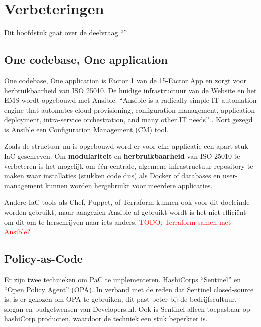 \chapter{Verbeteringen}

\label{Chapter5}

Dit hoofdstuk gaat over de deelvraag \enquote{\deelverbetering}

\section{One codebase, One application}
One codebase, One application is Factor 1 van de 15-Factor App en zorgt voor herbruikbaarheid van ISO 25010. De huidige infrastructuur van de Website en het EMS wordt opgebouwd met Ansible. \enquote{Ansible is a radically simple IT automation engine that automates cloud provisioning, configuration management, application deployment, intra-service orchestration, and many other IT needs} \parencite{Ansible}. Kort gezegd is Ansible een Configuration Management (CM) tool.

Zoals de structuur nu is opgebouwd word er voor elke applicatie een apart stuk IaC geschreven. Om \textbf{modulariteit} en \textbf{herbruikbaarheid} van ISO 25010 \parencite{ISO25010} te verbeteren is het mogelijk om één centrale, algemene infrastructuur repository te maken waar installaties (stukken code dus) als Docker of databases en user-management kunnen worden hergebruikt voor meerdere applicaties. 

Andere IaC tools als Chef, Puppet, of Terraform kunnen ook voor dit doeleinde worden gebruikt, maar aangezien Ansible al gebruikt wordt is het niet efficiënt om dit om te herschrijven naar iets anders. \textcolor{red}{TODO: Terraform samen met Ansible?} %

\section{Policy-as-Code}
Er zijn twee technieken om PaC te implementeren. HashiCorps \enquote{Sentinel} en \enquote{Open Policy Agent} (OPA). In verband met de reden dat Sentinel closed-source is, is er gekozen om OPA te gebruiken, dit past beter bij de bedrijfscultuur, slogan en budgetwensen van Developers.nl. Ook is Sentinel alleen toepasbaar op hashiCorp producten, waardoor de techniek een stuk beperkter is.

